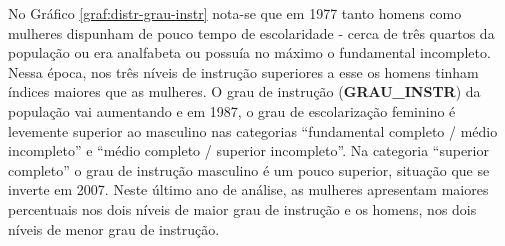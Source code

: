 \newpage
No Gráfico \ref{graf:distr-grau-instr} nota-se que em 1977 tanto homens como mulheres dispunham de pouco tempo de escolaridade - cerca de três quartos da população ou era analfabeta ou possuía no máximo o fundamental incompleto. Nessa época, nos três níveis de instrução superiores a esse os homens tinham índices maiores que as mulheres. O grau de instrução (\textbf{GRAU_INSTR}) da população vai aumentando e em 1987, o grau de escolarização feminino é levemente superior ao masculino nas categorias ``fundamental completo / médio incompleto'' e ``médio completo / superior incompleto''. Na categoria ``superior completo'' o grau de instrução masculino é um pouco superior, situação que se inverte em 2007. Neste último ano de análise, as mulheres apresentam maiores percentuais nos dois níveis de maior grau de instrução e os homens, nos dois níveis de menor grau de instrução.

%

